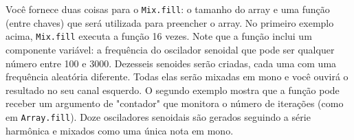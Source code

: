 Você fornece duas coisas para o \texttt{Mix.fill}: o tamanho do array e uma função (entre chaves) que será utilizada para preencher o array. No primeiro exemplo acima, \texttt{Mix.fill} executa a função 16 vezes. Note que a função inclui um componente variável: a frequência do oscilador senoidal que pode ser qualquer número entre 100 e 3000. Dezesseis senoides serão criadas, cada uma com uma frequência aleatória diferente. Todas elas serão mixadas em mono e você ouvirá o resultado no seu canal esquerdo.
O segundo exemplo mostra que a função pode receber um argumento de "contador" que monitora o número de iterações (como em \texttt{Array.fill}). 
Doze osciladores senoidais são gerados seguindo a série harmônica e mixados como uma única nota em mono.
